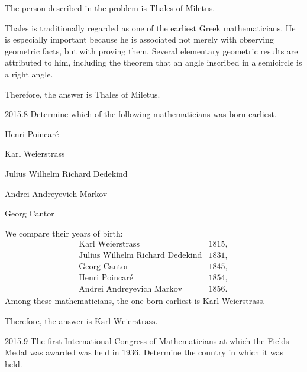     \begin{solution}
        The person described in the problem is Thales of Miletus.

        Thales is traditionally regarded as one of the earliest Greek mathematicians. He is
        especially important because he is associated not merely with observing geometric facts, but
        with proving them. Several elementary geometric results are attributed to him, including the
        theorem that an angle inscribed in a semicircle is a right angle.

        Therefore, the answer is $\boxed{\text{Thales of Miletus}}$.
    \end{solution}

    \begin{pastproblem}{2015.8}
        Determine which of the following mathematicians was born earliest.
        \begin{problemchoices}
            \item Henri Poincar\'e
            \item Karl Weierstrass
            \item Julius Wilhelm Richard Dedekind
            \item Andrei Andreyevich Markov
            \item Georg Cantor
        \end{problemchoices}
    \end{pastproblem}

    \begin{solution}
        We compare their years of birth:
        \[
            \begin{array}{ll}
                \text{Karl Weierstrass} & 1815, \\
                \text{Julius Wilhelm Richard Dedekind} & 1831, \\
                \text{Georg Cantor} & 1845, \\
                \text{Henri Poincar\'e} & 1854, \\
                \text{Andrei Andreyevich Markov} & 1856.
            \end{array}
        \]
        Among these mathematicians, the one born earliest is Karl Weierstrass.

        Therefore, the answer is $\boxed{\text{Karl Weierstrass}}$.
    \end{solution}

    \begin{pastproblem}{2015.9}
        The first International Congress of Mathematicians at which the Fields Medal was awarded was
        held in 1936. Determine the country in which it was held.
    \end{pastproblem}

